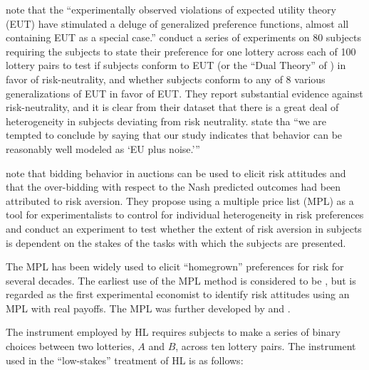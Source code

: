 \documentclass[../main.tex]{subfiles}
\begin{document}
\textcite[1291]{Hey1994} note that the \enquote{experimentally observed violations of expected utility theory (EUT) have stimulated a deluge of generalized preference functions, almost all containing  EUT as a special case.}
\textcite{Hey1994} conduct a series of experiments on 80 subjects requiring the subjects to state their preference for one lottery across each of 100 lottery pairs to test if subjects conform to EUT (or the \enquote{Dual Theory} of \textcite{Yaari1987}) in favor of risk-neutrality, and whether subjects conform to any of 8 various generalizations of EUT in favor of EUT.
They report substantial evidence against risk-neutrality, and it is clear from their dataset that there is a great deal of heterogeneity in subjects deviating from risk neutrality.
\textcite[1322]{Hey1994} state tha \enquote{we are tempted to conclude by saying that our study indicates that behavior can be reasonably well modeled \textelp{} as \enquote{EU plus noise.}} 

\textcite[1644]{Holt2002} note that bidding behavior in auctions can be used to elicit risk attitudes and that the over-bidding with respect to the Nash predicted outcomes had been attributed to risk aversion.
They propose using a multiple price list (MPL) as a tool for experimentalists to control for individual heterogeneity in risk preferences and conduct an experiment to test whether the extent of risk aversion in subjects is dependent on the stakes of the tasks with which the subjects are presented.

 
The MPL has been widely used to elicit \enquote{homegrown} preferences for risk for several decades.
The earliest use of the MPL method is considered to be \textcite{Miller1969}, but \textcite{Binswanger1980, Binswanger1981} is regarded as the first experimental economist to identify risk attitudes using an MPL with real payoffs.
The MPL was further developed by \textcite{Schubert1999} and \textcite{Holt2002}.

The instrument employed by HL requires subjects to make a series of binary choices between two lotteries, $A$ and $B$, across ten lottery pairs.
The instrument used in the \enquote{low-stakes} treatment of HL is as follows:
\end{document}
